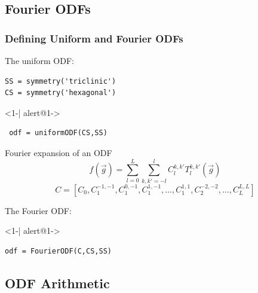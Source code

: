 \documentclass{beamer}
\begin{document}
\subsection*{Fourier ODFs}

\begin{frame}[fragile]
  \frametitle{Defining Uniform and  Fourier ODFs}

  The uniform ODF:
\begin{lstlisting}
SS = symmetry('triclinic')
CS = symmetry('hexagonal')
\end{lstlisting}

  \begin{actionenv}<1-| alert@1->
\begin{lstlisting}
 odf = uniformODF(CS,SS)
\end{lstlisting}
  \end{actionenv}  

  \begin{block}{Fourier expansion of an ODF}
    \begin{equation*}
      f(\vec g) = \sum_{l=0}^L \sum_{k,k'=-l}^l C_l^{k,k'} T_l^{k,k'}(\vec g)
    \end{equation*}
    \begin{equation*}
      C = [C_0,C_1^{-1,-1},C_1^{0,-1},C_1^{1,-1},\ldots,C_1^{1,1},C_2^{-2,-2},\ldots,C_L^{L,L}]
    \end{equation*}
  \end{block}
The Fourier ODF:
  \begin{actionenv}<1-| alert@1->
\begin{lstlisting}
odf = FourierODF(C,CS,SS)
\end{lstlisting}
  \end{actionenv}  



\end{frame}

\subsection{ODF Arithmetic}
\end{document}
